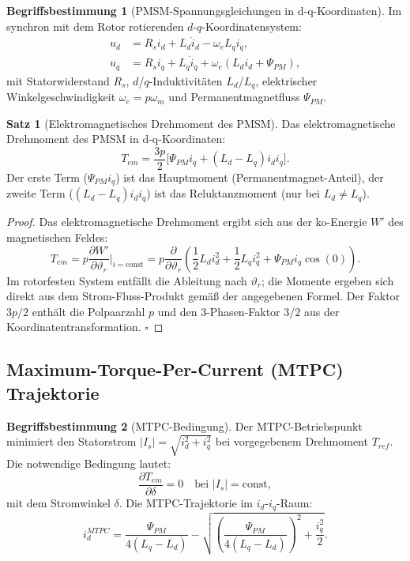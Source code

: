 ﻿\documentclass[a4paper,12pt,openany,oneside]{book}
\newcommand{\unterabschnitt}[1]{\subsection{#1}}
\theoremstyle{definition}
\newtheorem{definition}{Begriffsbestimmung}[chapter]
\newtheorem{satz}{Satz}[chapter]
\begin{document}
\begin{definition}[PMSM-Spannungsgleichungen in d-q-Koordinaten]
  Im synchron mit dem Rotor rotierenden $d$-$q$-Koordinatensystem:
  \begin{align*}
    u_d &= R_s i_d + L_d \dot{i}_d - \omega_e L_q i_q, \\
    u_q &= R_s i_q + L_q \dot{i}_q + \omega_e (L_d i_d + \Psi_{PM}),
  \end{align*}
  mit Statorwiderstand $R_s$, $d$/$q$-Induktivit\"aten $L_d$/$L_q$, elektrischer
  Winkelgeschwindigkeit $\omega_e = p \omega_m$ und Permanentmagnetfluss $\Psi_{PM}$.
\end{definition}

\begin{satz}[Elektromagnetisches Drehmoment des PMSM]
\label{satz:pmsm_moment}
  Das elektromagnetische Drehmoment des PMSM in d-q-Koordinaten:
  \[
    T_{em} = \frac{3p}{2} \bigl[\Psi_{PM} i_q + (L_d - L_q) i_d i_q\bigr].
  \]
  Der erste Term ($\Psi_{PM} i_q$) ist das Hauptmoment (Permanentmagnet-Anteil),
  der zweite Term ($( L_d - L_q) i_d i_q$) ist das Reluktanzmoment (nur bei $L_d \neq L_q$).
\end{satz}

\begin{proof}
  Das elektromagnetische Drehmoment ergibt sich aus der ko-Energie $W'$ des magnetischen Feldes:
  \[
    T_{em} = p \frac{\partial W'}{\partial \vartheta_r}\bigg|_{i=\mathrm{const}}
    = p \frac{\partial}{\partial \vartheta_r} \left(\frac{1}{2} L_d i_d^2 + \frac{1}{2} L_q i_q^2
      + \Psi_{PM} i_q \cos(0) \right).
  \]
  Im rotorfesten System entf\"allt die Ableitung nach $\vartheta_r$; die Momente
  ergeben sich direkt aus dem Strom-Fluss-Produkt gem\"a\ss{} der angegebenen Formel.
  Der Faktor $3p/2$ enth\"alt die Polpaarzahl $p$ und den 3-Phasen-Faktor $3/2$ aus der
  Koordinatentransformation. \qquad$\square$
\end{proof}

\unterabschnitt{Maximum-Torque-Per-Current (MTPC) Trajektorie}

\begin{definition}[MTPC-Bedingung]
  Der MTPC-Betriebspunkt minimiert den Statorstrom $|I_s| = \sqrt{i_d^2 + i_q^2}$ bei
  vorgegebenem Drehmoment $T_{ref}$. Die notwendige Bedingung lautet:
  \[
    \frac{\partial T_{em}}{\partial \delta} = 0 \quad \text{bei } |I_s| = \mathrm{const},
  \]
  mit dem Stromwinkel $\delta$. Die MTPC-Trajektorie im $i_d$-$i_q$-Raum:
  \[
    i_d^{MTPC} = \frac{\Psi_{PM}}{4(L_q - L_d)} -
    \sqrt{\left(\frac{\Psi_{PM}}{4(L_q-L_d)}\right)^2 + \frac{i_q^2}{2}}.
  \]
\end{definition}
\end{document}
